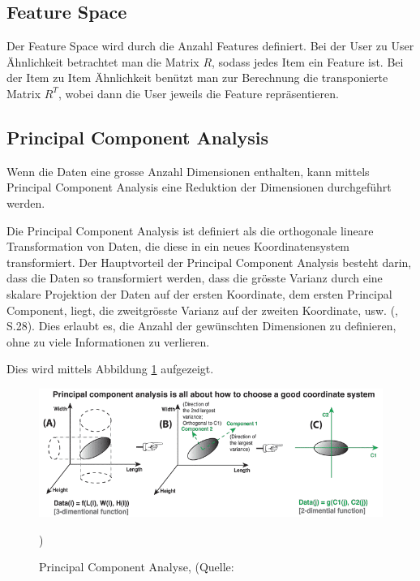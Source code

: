 \subsection{Feature Space}
Der Feature Space wird durch die Anzahl Features definiert.
Bei der User zu User Ähnlichkeit betrachtet man die Matrix $R$, sodass jedes Item ein Feature ist. Bei der Item zu Item Ähnlichkeit benützt man zur Berechnung die transponierte Matrix $R^T$, wobei dann die User jeweils die Feature repräsentieren.


\subsection{Principal Component Analysis}
Wenn die Daten eine grosse Anzahl Dimensionen enthalten, kann mittels Principal Component Analysis eine Reduktion der Dimensionen durchgeführt werden.

Die Principal Component Analysis ist definiert als die orthogonale lineare Transformation von Daten, die diese in ein neues Koordinatensystem transformiert. Der Hauptvorteil der Principal Component Analysis besteht darin, dass die Daten so transformiert werden, dass die grösste Varianz durch eine skalare Projektion der Daten auf der ersten Koordinate, dem ersten Principal Component, liegt, die zweitgrösste Varianz auf der zweiten Koordinate, usw. (\cite{jolliffe_principal_2002}, S.28). Dies erlaubt es, die Anzahl der gewünschten Dimensionen zu definieren, ohne zu viele Informationen zu verlieren.

Dies wird mittels Abbildung \ref{fig:PCA} aufgezeigt.

\begin{figure}[ht]
	\centering
	\includegraphics[keepaspectratio,width=0.66\linewidth]{img/PCA.png}
	\caption{Principal Component Analyse, (Quelle: })
	\label{fig:PCA}
\end{figure}

